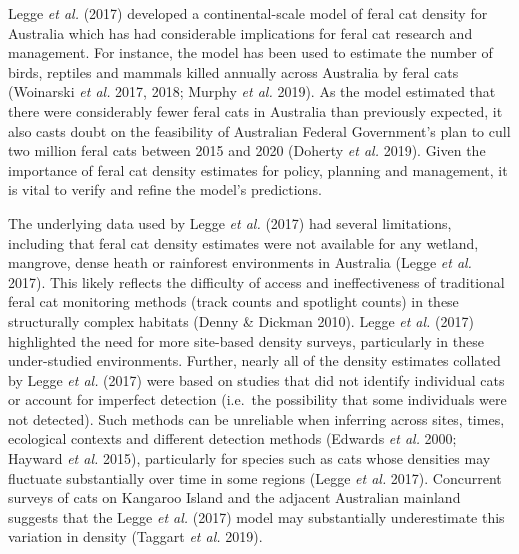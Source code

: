 \documentclass[11pt,a4paper,titlepage,twoside,openright]{style/unimelbthesis}
\begin{document}
\begin{mainmatter}
Legge \emph{et al.} (2017) developed a continental-scale model of feral cat density for Australia which has had considerable implications for feral cat research and management. For instance, the model has been used to estimate the number of birds, reptiles and mammals killed annually across Australia by feral cats (Woinarski \emph{et al.} 2017, 2018; Murphy \emph{et al.} 2019). As the model estimated that there were considerably fewer feral cats in Australia than previously expected, it also casts doubt on the feasibility of Australian Federal Government's plan to cull two million feral cats between 2015 and 2020 (Doherty \emph{et al.} 2019). Given the importance of feral cat density estimates for policy, planning and management, it is vital to verify and refine the model's predictions.

The underlying data used by Legge \emph{et al.} (2017) had several limitations, including that feral cat density estimates were not available for any wetland, mangrove, dense heath or rainforest environments in Australia (Legge \emph{et al.} 2017). This likely reflects the difficulty of access and ineffectiveness of traditional feral cat monitoring methods (track counts and spotlight counts) in these structurally complex habitats (Denny \& Dickman 2010). Legge \emph{et al.} (2017) highlighted the need for more site-based density surveys, particularly in these under-studied environments. Further, nearly all of the density estimates collated by Legge \emph{et al.} (2017) were based on studies that did not identify individual cats or account for imperfect detection (i.e.~the possibility that some individuals were not detected). Such methods can be unreliable when inferring across sites, times, ecological contexts and different detection methods (Edwards \emph{et al.} 2000; Hayward \emph{et al.} 2015), particularly for species such as cats whose densities may fluctuate substantially over time in some regions (Legge \emph{et al.} 2017). Concurrent surveys of cats on Kangaroo Island and the adjacent Australian mainland suggests that the Legge \emph{et al.} (2017) model may substantially underestimate this variation in density (Taggart \emph{et al.} 2019).


\end{mainmatter}
\end{document}
